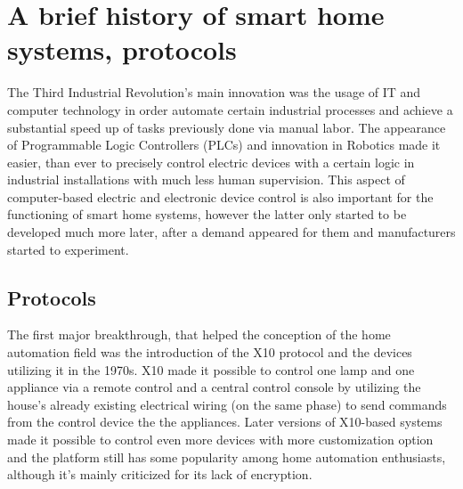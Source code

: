 \section{A brief history of smart home systems, protocols}

The Third Industrial Revolution's main innovation was the usage of IT and computer technology in order automate certain industrial processes and achieve a substantial speed up of tasks previously done via manual labor. \cite{UpkeepIndRev}
The appearance of Programmable Logic Controllers (PLCs) and innovation in Robotics made it easier, than ever to precisely control electric devices with a certain logic in industrial installations with much less human supervision. This aspect of computer-based electric and electronic device control is also important for the functioning of smart home systems, however the latter only started to be developed much more later, after a demand appeared for them and manufacturers started to experiment. %

\subsection{Protocols}

The first major breakthrough, that helped the conception of the home automation field was the introduction of the X10 protocol and the devices utilizing it in the 1970s. X10 made it possible to control one lamp and one appliance via a remote control and a central control console by utilizing the house's already existing electrical wiring (on the same phase) to send commands from the control device the the appliances. Later versions of X10-based systems made it possible to control even more devices with more customization option and the platform still has some popularity among home automation enthusiasts, although it's mainly criticized for its lack of encryption. \cite{CavaX10}


